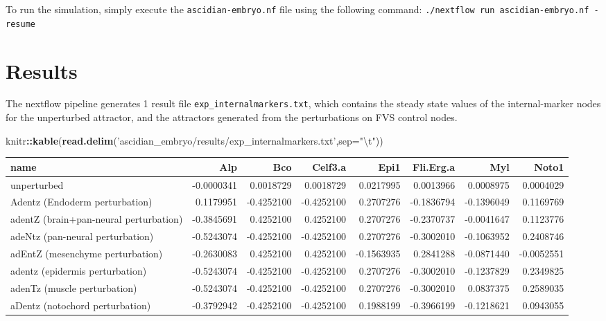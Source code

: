\documentclass[
]{book}
\newenvironment{Shaded}{\begin{snugshade}}{\end{snugshade}}
\newcommand{\CharTok}[1]{\textcolor[rgb]{0.31,0.60,0.02}{#1}}
\newcommand{\DataTypeTok}[1]{\textcolor[rgb]{0.13,0.29,0.53}{#1}}
\newcommand{\KeywordTok}[1]{\textcolor[rgb]{0.13,0.29,0.53}{\textbf{#1}}}
\newcommand{\NormalTok}[1]{#1}
\newcommand{\OperatorTok}[1]{\textcolor[rgb]{0.81,0.36,0.00}{\textbf{#1}}}
\newcommand{\StringTok}[1]{\textcolor[rgb]{0.31,0.60,0.02}{#1}}
\theoremstyle{definition}
\theoremstyle{definition}
\theoremstyle{definition}
\theoremstyle{definition}
\theoremstyle{remark}
\begin{document}
To run the simulation, simply execute the \texttt{ascidian-embryo.nf} file using the following command: \texttt{./nextflow\ run\ ascidian-embryo.nf\ -resume}

\hypertarget{results}{%
\section{Results}\label{results}}

The nextflow pipeline generates 1 result file \texttt{exp\_internalmarkers.txt}, which contains the steady state values of the internal-marker nodes for the unperturbed attractor, and the attractors generated from the perturbations on FVS control nodes.

\begin{Shaded}
\begin{Highlighting}[]
\NormalTok{knitr}\OperatorTok{::}\KeywordTok{kable}\NormalTok{(}\KeywordTok{read.delim}\NormalTok{(}\StringTok{'ascidian_embryo/results/exp_internalmarkers.txt'}\NormalTok{,}\DataTypeTok{sep=}\StringTok{"}\CharTok{\textbackslash{}t}\StringTok{"}\NormalTok{))}
\end{Highlighting}
\end{Shaded}

\begin{tabular}{l|r|r|r|r|r|r|r}
\hline
name & Alp & Bco & Celf3.a & Epi1 & Fli.Erg.a & Myl & Noto1\\
\hline
unperturbed & -0.0000341 & 0.0018729 & 0.0018729 & 0.0217995 & 0.0013966 & 0.0008975 & 0.0004029\\
\hline
Adentz (Endoderm perturbation) & 0.1179951 & -0.4252100 & -0.4252100 & 0.2707276 & -0.1836794 & -0.1396049 & 0.1169769\\
\hline
adentZ (brain+pan-neural perturbation) & -0.3845691 & 0.4252100 & 0.4252100 & 0.2707276 & -0.2370737 & -0.0041647 & 0.1123776\\
\hline
adeNtz (pan-neural perturbation) & -0.5243074 & -0.4252100 & -0.4252100 & 0.2707276 & -0.3002010 & -0.1063952 & 0.2408746\\
\hline
adEntZ (mesenchyme perturbation) & -0.2630083 & 0.4252100 & 0.4252100 & -0.1563935 & 0.2841288 & -0.0871440 & -0.0052551\\
\hline
adentz (epidermis perturbation) & -0.5243074 & -0.4252100 & -0.4252100 & 0.2707276 & -0.3002010 & -0.1237829 & 0.2349825\\
\hline
adenTz (muscle perturbation) & -0.5243074 & -0.4252100 & -0.4252100 & 0.2707276 & -0.3002010 & 0.0837375 & 0.2589035\\
\hline
aDentz (notochord perturbation) & -0.3792942 & -0.4252100 & -0.4252100 & 0.1988199 & -0.3966199 & -0.1218621 & 0.0943055\\
\hline
\end{tabular}
\end{document}
